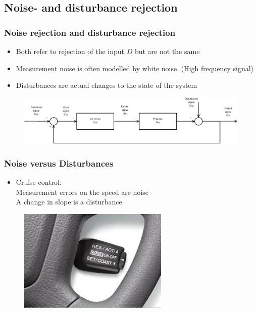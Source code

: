\subsection[Noise- and disturbance rejection]{Noise- and disturbance rejection}

\begin{frame}
	\frametitle{Noise rejection and disturbance rejection}
	\begin{itemize}
		\item Both refer to rejection of the input $D$ but are not the same
		\item Measurement noise is often modelled by white noise. (High frequency signal)
		\item Disturbances are actual changes to the state of the system
	\end{itemize}
\begin{figure}
\centering
\includegraphics[width=0.7\linewidth]{Closed-Loop}
\label{fig:Closed-Loop3}
\end{figure}
\end{frame}


\begin{frame}
	\frametitle{Noise versus Disturbances}
	\begin{itemize}
		\item Cruise control: \\
		Measurement errors on the speed are noise \\
		A change in slope is a disturbance
	\end{itemize}
	\begin{figure}
\centering
\includegraphics[width=0.7\linewidth]{"cruise control"}
\label{fig:cruisecontrol}
\end{figure}
\end{frame}

